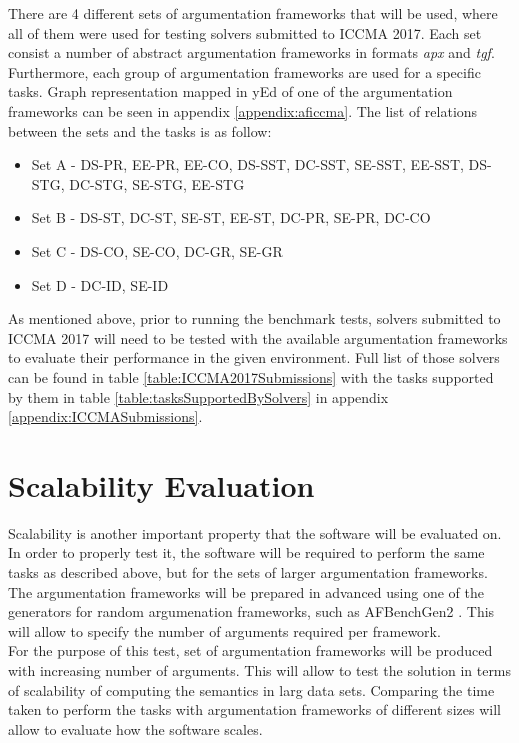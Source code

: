 There are 4 different sets of argumentation frameworks that will be used, where all of them were used for testing solvers submitted to ICCMA 2017. Each set consist a number of abstract argumentation frameworks in formats \textit{apx} and \textit{tgf}. Furthermore, each group of argumentation frameworks are used for a specific tasks. Graph representation mapped in yEd of one of the argumentation frameworks can be seen in appendix \ref{appendix:aficcma}. The list of relations between the sets and the tasks is as follow:
\begin{itemize}
	\item{Set A - DS-PR, EE-PR, EE-CO, DS-SST, DC-SST, SE-SST, EE-SST, DS-STG, DC-STG, SE-STG, EE-STG}
	\item{Set B - DS-ST, DC-ST, SE-ST, EE-ST, DC-PR, SE-PR, DC-CO}
	\item{Set C - DS-CO, SE-CO, DC-GR, SE-GR}
	\item{Set D - DC-ID, SE-ID}
\end{itemize}

As mentioned above, prior to running the benchmark tests, solvers submitted to ICCMA 2017 will need to be tested with the available argumentation frameworks to evaluate their performance in the given environment. Full list of those solvers can be found in table \ref{table:ICCMA2017Submissions} with the tasks supported by them in table \ref{table:tasksSupportedBySolvers} in appendix \ref{appendix:ICCMASubmissions}.

\section{Scalability Evaluation}
Scalability is another important property that the software will be evaluated on. In order to properly test it, the software will be required to perform the same tasks as described above, but for the sets of larger argumentation frameworks. The argumentation frameworks will be prepared in advanced using one of the generators for random argumenation frameworks, such as AFBenchGen2 \citep{ceruttigenerator}. This will allow to specify the number of arguments required per framework. \\
For the purpose of this test, set of argumentation frameworks will be produced with increasing number of arguments. This will allow to test the solution in terms of scalability of computing the semantics in larg data sets. Comparing the time taken to perform the tasks with argumentation frameworks of different sizes will allow to evaluate how the software scales.

